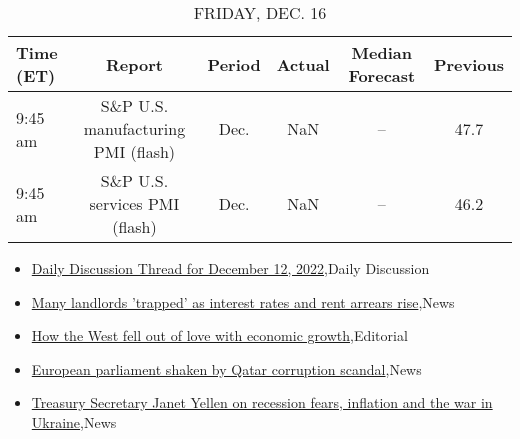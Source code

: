 \documentclass{article}%
\begin{document}
%


\begin{table}[htbp]%
\caption{FRIDAY, DEC. 16}%
\centering%
\begin{adjustbox}{width=1\textwidth}%
\begin{tabular}{lccccc}
\toprule
Time (ET) &                             Report & Period & Actual & Median Forecast & Previous \\
\midrule
  9:45 am & S\&P U.S. manufacturing PMI (flash) &   Dec. &    NaN &              -- &     47.7 \\
  9:45 am &      S\&P U.S. services PMI (flash) &   Dec. &    NaN &              -- &     46.2 \\
\bottomrule
\end{tabular}
%
\end{adjustbox}%
\end{table}

%
\begin{itemize}%
\item%
\href{https://reddit.com/r/wallstreetbets/comments/zjvqab/daily\_discussion\_thread\_for\_december\_12\_2022/}{Daily Discussion Thread for December 12, 2022},Daily Discussion%
\item%
\href{https://reddit.com/r/Economics/comments/zjw9vt/many\_landlords\_trapped\_as\_interest\_rates\_and\_rent/}{Many landlords 'trapped' as interest rates and rent arrears rise},News%
\item%
\href{https://reddit.com/r/Economics/comments/zjuaez/how\_the\_west\_fell\_out\_of\_love\_with\_economic\_growth/}{How the West fell out of love with economic growth},Editorial%
\item%
\href{https://reddit.com/r/Economics/comments/zjredj/european\_parliament\_shaken\_by\_qatar\_corruption/}{European parliament shaken by Qatar corruption scandal},News%
\item%
\href{https://reddit.com/r/Economics/comments/zjombu/treasury\_secretary\_janet\_yellen\_on\_recession/}{Treasury Secretary Janet Yellen on recession fears, inflation and the war in Ukraine},News%
\end{itemize}%
\end{document}
